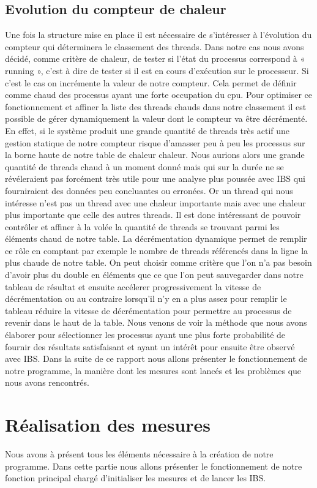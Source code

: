 \subsection{Evolution du compteur de chaleur}
Une fois la structure mise en place il est nécessaire de s’intéresser à l'évolution du compteur qui déterminera le classement des threads.
Dans notre cas nous avons décidé, comme critère de chaleur, de tester si l'état du processus correspond à
« running », c'est à dire de tester si il est en cours d’exécution sur le processeur. Si c'est le cas on incrémente la valeur de notre compteur. Cela permet de définir comme chaud des processus ayant une forte occupation du cpu.
Pour optimiser ce fonctionnement et affiner la liste des threads chauds dans notre classement il est possible de gérer dynamiquement la valeur dont le compteur va être décrémenté. En effet, si le système produit une grande quantité de threads très actif une gestion statique de notre compteur risque d'amasser peu à peu les processus sur la borne haute de notre table de chaleur chaleur. Nous aurions alors une grande quantité de threads chaud à un moment donné mais qui sur la durée ne se révéleraient pas forcément très utile pour une analyse plus poussée avec IBS qui fourniraient des données peu concluantes ou erronées.
Or un thread qui nous intéresse n'est pas un thread avec une chaleur importante mais avec une chaleur plus importante que celle des autres threads. Il est donc intéressant de pouvoir contrôler et affiner à la volée la quantité de threads se trouvant parmi les éléments chaud de notre table. La décrémentation dynamique permet de remplir ce rôle en comptant par exemple le nombre de threads référencés dans la ligne la plus chaude de notre table. On peut choisir comme critère que l'on n'a pas besoin d'avoir plus du double en éléments que ce que l'on peut sauvegarder dans notre tableau de résultat et ensuite accélerer progressivement la vitesse de décrémentation ou au contraire lorsqu'il n'y en a plus assez pour remplir le tableau réduire la vitesse de décrémentation pour permettre au processus de revenir dans le haut de la table.
Nous venons de voir la méthode que nous avons élaborer pour sélectionner les processus ayant une plus forte probabilité de fournir des résultats satisfaisant et ayant un intérêt pour ensuite être observé avec IBS. Dans la suite de ce rapport nous allons présenter le fonctionnement de notre programme, la manière dont les mesures sont lancés et les problèmes que nous avons rencontrés.
\section{Réalisation des mesures}
Nous avons à présent tous les éléments nécessaire à la création de notre programme. Dans cette partie nous allons présenter le fonctionnement de notre fonction principal chargé d'initialiser les mesures et de lancer les IBS.

